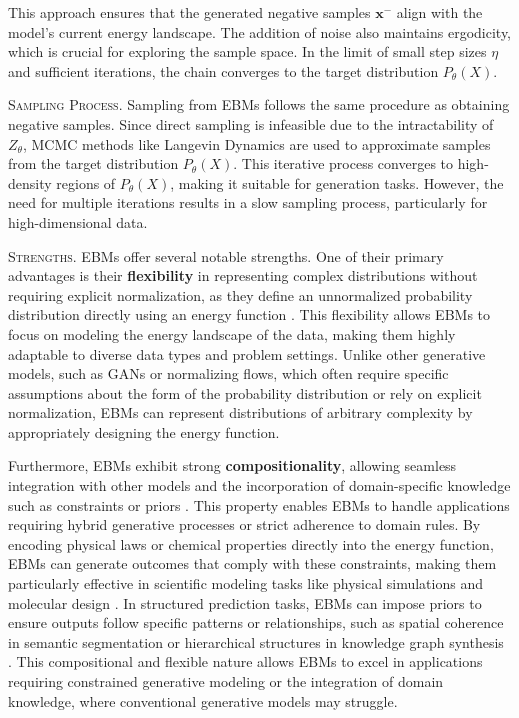 This approach ensures that the generated negative samples \(\mathbf{x}^-\) align with the model's current energy landscape. The addition of noise also maintains ergodicity, which is crucial for exploring the sample space. In the limit of small step sizes \(\eta\) and sufficient iterations, the chain converges to the target distribution \(P_\theta(X)\).

\textsc{Sampling Process.} Sampling from EBMs follows the same procedure as obtaining negative samples. Since direct sampling is infeasible due to the intractability of \( Z_\theta \), MCMC methods like Langevin Dynamics are used to approximate samples from the target distribution \( P_\theta(X) \). This iterative process converges to high-density regions of \( P_\theta(X) \), making it suitable for generation tasks. However, the need for multiple iterations results in a slow sampling process, particularly for high-dimensional data.

\textsc{Strengths.} EBMs offer several notable strengths. One of their primary advantages is their \textbf{flexibility} in representing complex distributions without requiring explicit normalization, as they define an unnormalized probability distribution directly using an energy function \cite{lecun2006tutorial}. This flexibility allows EBMs to focus on modeling the energy landscape of the data, making them highly adaptable to diverse data types and problem settings. Unlike other generative models, such as GANs or normalizing flows, which often require specific assumptions about the form of the probability distribution or rely on explicit normalization, EBMs can represent distributions of arbitrary complexity by appropriately designing the energy function.

Furthermore, EBMs exhibit strong \textbf{compositionality}, allowing seamless integration with other models and the incorporation of domain-specific knowledge such as constraints or priors \cite{du2019implicit, grathwohl2020your}. This property enables EBMs to handle applications requiring hybrid generative processes or strict adherence to domain rules. By encoding physical laws or chemical properties directly into the energy function, EBMs can generate outcomes that comply with these constraints, making them particularly effective in scientific modeling tasks like physical simulations and molecular design \cite{du2019implicit}. In structured prediction tasks, EBMs can impose priors to ensure outputs follow specific patterns or relationships, such as spatial coherence in semantic segmentation or hierarchical structures in knowledge graph synthesis \cite{grathwohl2020your, lecun2006tutorial}. This compositional and flexible nature allows EBMs to excel in applications requiring constrained generative modeling or the integration of domain knowledge, where conventional generative models may struggle.

